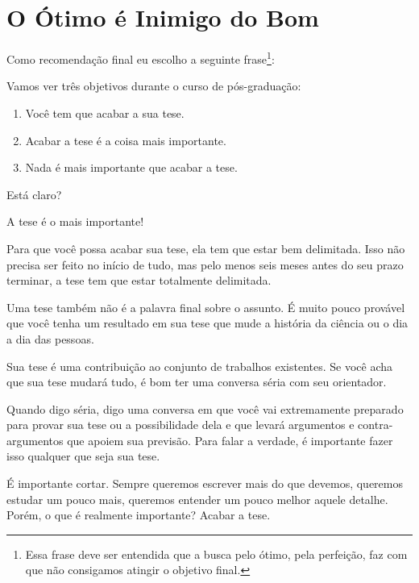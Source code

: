 \chapter{O Ótimo é Inimigo do Bom}

Como recomendação final eu escolho a seguinte frase\footnote{Essa frase deve ser entendida que a busca pelo ótimo, pela perfeição, faz com que não consigamos atingir o objetivo final.}: 



Vamos ver três objetivos durante o curso de pós-graduação:
\begin{enumerate}
\item	Você tem que acabar a sua tese. 
\item	Acabar a tese é a coisa mais importante. 
\item	Nada é mais importante que acabar a tese.
\end{enumerate}

Está claro? 

A tese é o mais importante!

Para que você possa acabar sua tese, ela tem que estar bem delimitada. 
Isso não precisa ser feito no início de tudo, mas pelo menos seis meses antes do seu prazo terminar, a tese tem que estar totalmente delimitada. 

Uma tese também não é a palavra final sobre o assunto. É muito pouco provável que você tenha um resultado em sua tese que mude a história da ciência ou o dia a dia das pessoas. 

Sua tese é uma contribuição ao conjunto de trabalhos existentes. Se você acha que sua tese mudará tudo, é bom ter uma conversa séria com seu orientador. 

Quando digo séria, digo uma conversa em que você vai extremamente preparado para provar sua tese ou a possibilidade dela e que levará argumentos e contra-argumentos que apoiem sua previsão. Para falar a verdade, é importante fazer isso qualquer que seja sua tese.

É importante cortar. Sempre queremos escrever mais do que devemos, queremos estudar um pouco mais, queremos entender um pouco melhor aquele detalhe. Porém, o que é realmente importante? Acabar a tese. 

